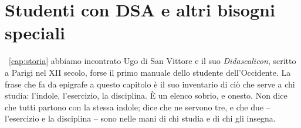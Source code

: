 \chapter{Studenti con DSA e altri bisogni speciali}
\label{cap:dsa}


~\ref{cap:storia} abbiamo incontrato Ugo di
San Vittore e il suo \emph{Didascalicon}, scritto a Parigi nel XII
secolo, forse il primo manuale dello studente dell'Occidente. La frase
che fa da epigrafe a questo capitolo è il suo inventario di ciò che
serve a chi studia: l'indole, l'esercizio, la disciplina. È un elenco
sobrio, e onesto. Non dice che tutti partono con la stessa indole;
dice che ne servono tre, e che due -- l'esercizio e la disciplina --
sono nelle mani di chi studia e di chi gli insegna.


